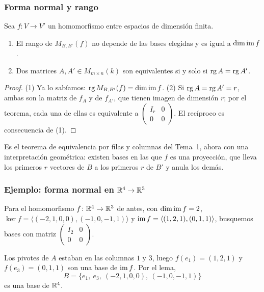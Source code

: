 \begin{frame}
    \frametitle{Forma normal y rango}

    \begin{corollary}
        Sea $f\colon V\to V'$ un homomorfismo entre espacios de dimensión
        finita.
        \begin{enumerate}[(1)]
            \item El rango de $M_{B,B'}(f)$ no depende de las bases elegidas
            y es igual a $\dim\operatorname{im} f$.
            \item Dos matrices $A,A'\in M_{m\times n}(k)$ son equivalentes
            si y solo si $\operatorname{rg} A=\operatorname{rg} A'$.
        \end{enumerate}
    \end{corollary}

    \begin{proof}
        (1) Ya lo sabíamos: $\operatorname{rg} M_{B,B'}(f)=\dim\operatorname{im} f$. (2) Si
        $\operatorname{rg} A=\operatorname{rg} A'=r$, ambas son la matriz de $f_A$ y de $f_{A'}$, que
        tienen imagen de dimensión $r$; por el teorema, cada una de ellas es equivalente
        a $\left(\begin{smallmatrix}I_r&0\\0&0\end{smallmatrix}\right)$.
        El recíproco es consecuencia de (1).
    \end{proof}

    \medskip

    Es el teorema de equivalencia por filas y columnas del Tema~1, ahora
    con una interpretación geométrica: \alert{existen bases en las que $f$
    es una proyección}, que lleva los primeros $r$ vectores de $B$ a los
    primeros $r$ de $B'$ y anula los demás.
\end{frame}


\begin{frame}
    \frametitle{Ejemplo: forma normal en $\mathbb{R}^4\to\mathbb{R}^3$}

    \begin{example}
        Para el homomorfismo $f\colon\mathbb{R}^4\to\mathbb{R}^3$ de antes, con $\dim\operatorname{im} f=2$,
        $\ker f=\langle(-2,1,0,0),(-1,0,-1,1)\rangle$ y
        $\operatorname{im} f=\langle(1,2,1),(0,1,1)\rangle$, busquemos bases con matriz
        $\left(\begin{smallmatrix}I_2&0\\0&0\end{smallmatrix}\right)$.
    \end{example}

    Los pivotes de $A$ estaban en las columnas $1$ y $3$, luego
    $f(e_1)=(1,2,1)$ y $f(e_3)=(0,1,1)$ son una base de $\operatorname{im} f$. Por el
    lema,
    \[
        B=\{e_1,\ e_3,\ (-2,1,0,0),\ (-1,0,-1,1)\}
    \]
    es una base de $\mathbb{R}^4$.
\end{frame}


